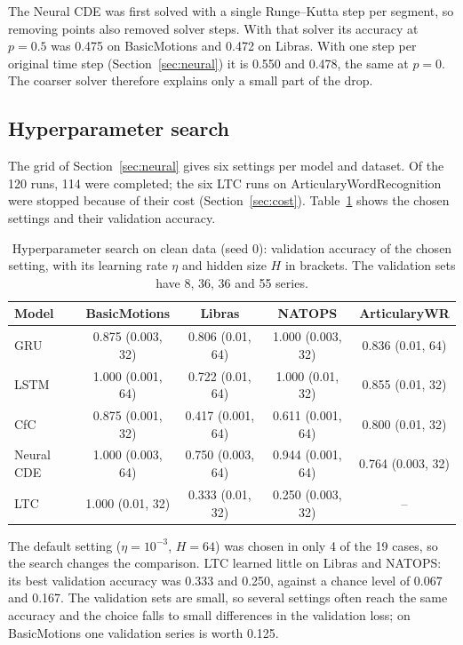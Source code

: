 The Neural CDE was first solved with a single Runge--Kutta step per
segment, so removing points also removed solver steps. With that solver
its accuracy at $p = 0.5$ was 0.475 on BasicMotions and 0.472 on Libras.
With one step per original time step (Section~\ref{sec:neural}) it is
0.550 and 0.478, the same at $p = 0$. The coarser solver therefore
explains only a small part of the drop.

\subsection{Hyperparameter search}

The grid of Section~\ref{sec:neural} gives six settings per model and
dataset. Of the 120 runs, 114 were completed; the six LTC runs on
ArticularyWordRecognition were stopped because of their cost
(Section~\ref{sec:cost}). Table~\ref{tab:tuning} shows the chosen settings
and their validation accuracy.

\begin{table}[ht]
\centering
\small
\caption{Hyperparameter search on clean data (seed 0): validation accuracy
of the chosen setting, with its learning rate $\eta$ and hidden size $H$
in brackets. The validation sets have 8, 36, 36 and 55 series.}
\label{tab:tuning}
\setlength{\tabcolsep}{4pt}
\begin{tabular}{lcccc}
\toprule
Model & BasicMotions & Libras & NATOPS & ArticularyWR \\
\midrule
GRU & 0.875 (0.003, 32) & 0.806 (0.01, 64) & 1.000 (0.003, 32) & 0.836 (0.01, 64) \\
LSTM & 1.000 (0.001, 64) & 0.722 (0.01, 64) & 1.000 (0.01, 32) & 0.855 (0.01, 32) \\
CfC & 0.875 (0.001, 32) & 0.417 (0.001, 64) & 0.611 (0.001, 64) & 0.800 (0.01, 32) \\
Neural CDE & 1.000 (0.003, 64) & 0.750 (0.003, 64) & 0.944 (0.001, 64) & 0.764 (0.003, 32) \\
LTC & 1.000 (0.01, 32) & 0.333 (0.01, 32) & 0.250 (0.003, 32) & -- \\
\bottomrule
\end{tabular}
\end{table}

The default setting ($\eta = 10^{-3}$, $H = 64$) was chosen in only 4 of
the 19 cases, so the search changes the comparison. LTC learned little on
Libras and NATOPS: its best validation accuracy was 0.333 and 0.250,
against a chance level of 0.067 and 0.167. The validation sets are
small, so several settings often reach the same accuracy and the choice
falls to small differences in the validation loss; on BasicMotions one
validation series is worth 0.125.

